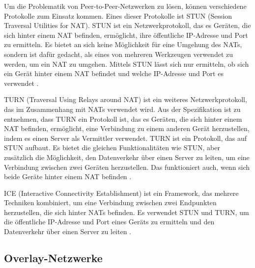Um die Problematik von Peer-to-Peer-Netzwerken zu lösen, können verschiedene Protokolle zum Einsatz kommen. Eines dieser Protokolle ist STUN (Session Traversal Utilities for NAT). STUN ist ein Netzwerkprotokoll, das es Geräten, die sich hinter einem NAT befinden, ermöglicht, ihre öffentliche IP-Adresse und Port zu ermitteln. Es bietet an sich keine Möglichkeit für eine Umgehung des NATs, sondern ist dafür gedacht, als eines von mehreren Werkzeugen verwendet zu werden, um ein NAT zu umgehen. Mittels STUN lässt sich nur ermitteln, ob sich ein Gerät hinter einem NAT befindet und welche IP-Adresse und Port es verwendet \parencite[S. 4]{rfc8489_STUN}.

TURN (Traversal Using Relays around NAT) ist ein weiteres Netzwerkprotokoll, das im Zusammenhang mit NATs verwendet wird. Aus der Spezifikation ist zu entnehmen, dass TURN ein Protokoll ist, das es Geräten, die sich hinter einem NAT befinden, ermöglicht, eine Verbindung zu einem anderen Gerät herzustellen, indem es einen Server als Vermittler verwendet. TURN ist ein Protokoll, das auf STUN aufbaut. Es bietet die gleichen Funktionalitäten wie STUN, aber zusätzlich die Möglichkeit, den Datenverkehr über einen Server zu leiten, um eine Verbindung zwischen zwei Geräten herzustellen. Das funktioniert auch, wenn sich beide Geräte hinter einem NAT befinden \parencite[S. 7]{rfc8656_TURN}.

ICE (Interactive Connectivity Establishment) ist ein Framework, das mehrere Techniken kombiniert, um eine Verbindung zwischen zwei Endpunkten herzustellen, die sich hinter NATs befinden. Es verwendet STUN und TURN, um die öffentliche IP-Adresse und Port eines Geräts zu ermitteln und den Datenverkehr über einen Server zu leiten \Parencite[S. 6]{rfc8445_ICE}.


\subsection{Overlay-Netzwerke}

